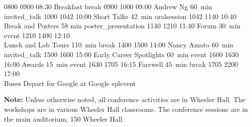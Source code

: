 \begin{timetable}
   {0800} {0900} {08:30 Breakfast}                      {}                            {}        {break}
   {0900} {1000} {09:00 Andrew Ng}                            {60~min}                           {}                      {invited_talk}
   {1000} {1042} {10:00 Short Talks}                          {\vspace{1.5mm}42~min}             {}        {oralsession}
   {1042} {1140} {10:40 Break and Posters}                    {\vspace{1.5mm}58 min}             {}      {poster_presentation}
   {1140} {1210} {11:40 Forum}                                {\vspace{1.5mm}30~min}             {}                      {event}
   {1210} {1400} {12:10\\[0.2em]Lunch and Lab Tours}          {110~min}                          {}                            {break}
   {1400} {1500} {14:00 Nancy Amato}                          {60~min}                           {}                      {invited_talk}
   {1500} {1600} {15:00 Early Career Spotlights} 	      {\vspace{1.5mm}60~min}             {}        {event}
   {1600} {1630} {16:00 Awards} 	              {\vspace{1.5mm}15~min}             {}        {event}
   {1630} {1705} {16:15 Farewell} 	              {\vspace{1.5mm}45~min}             {}        {break}
   {1705} {2200} {17:00\\\vspace{0.3em}Buses Depart for Google}     {}                              {at Google}     {splevent}
\end{timetable}

\begingroup
\large {\textbf{Note:} Unless otherwise noted, all conference activities are in Wheeler Hall. The workshops are in various Wheeler Hall classrooms.  The conference sessions are in the main auditorium, 150 Wheeler Hall.}
\endgroup




\begingroup %
\sffamily



